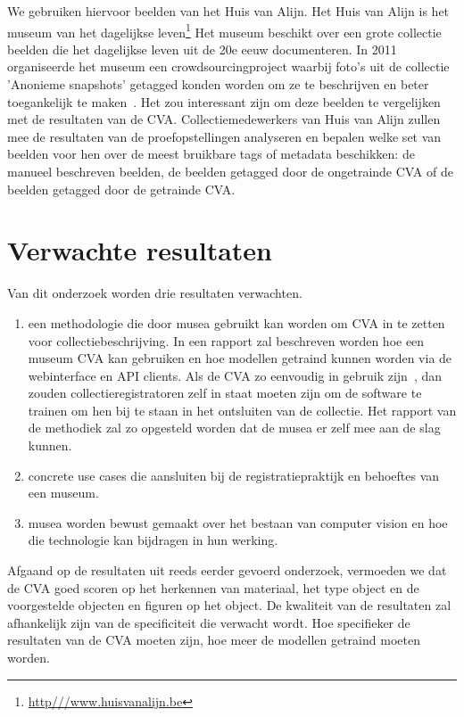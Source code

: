 We gebruiken hiervoor beelden van het Huis van Alijn. Het Huis van Alijn is het museum van het dagelijkse leven\footnote{\url{http///www.huisvanalijn.be}} Het museum beschikt over een grote collectie beelden die het dagelijkse leven uit de 20e eeuw documenteren. In 2011 organiseerde het museum een crowdsourcingproject waarbij foto's uit de collectie 'Anonieme snapshots' getagged konden worden om ze te beschrijven en beter toegankelijk te maken~\autocite{Wiericx2011}. Het zou interessant zijn om deze beelden te vergelijken met de resultaten van de CVA. Collectiemedewerkers van Huis van Alijn zullen mee de resultaten van de proefopstellingen analyseren en bepalen welke set van beelden voor hen over de meest bruikbare tags of metadata beschikken: de manueel beschreven beelden, de beelden getagged door de ongetrainde CVA of de beelden getagged door de getrainde CVA.
\section{Verwachte resultaten}
\label{sec:verwachte_resultaten}

Van dit onderzoek worden drie resultaten verwachten.

\begin{enumerate}
\item een methodologie die door musea gebruikt kan worden om CVA in te zetten voor collectiebeschrijving. In een rapport zal beschreven worden hoe een museum CVA kan gebruiken en hoe modellen getraind kunnen worden via de webinterface en API clients. Als de CVA zo eenvoudig in gebruik zijn~\autocite{Lardinois2018}, dan zouden collectieregistratoren zelf in staat moeten zijn om de software te trainen om hen bij te staan in het ontsluiten van de collectie. Het rapport van de methodiek zal zo opgesteld worden dat de musea er zelf mee aan de slag kunnen.
\item concrete use cases die aansluiten bij de registratiepraktijk en behoeftes van een museum.
\item musea worden bewust gemaakt over het bestaan van computer vision en hoe die technologie kan bijdragen in hun werking.
\end{enumerate}

Afgaand op de resultaten uit reeds eerder gevoerd onderzoek, vermoeden we dat de CVA goed scoren op het herkennen van materiaal, het type object en de voorgestelde objecten en figuren op het object. De kwaliteit van de resultaten zal afhankelijk zijn van de specificiteit die verwacht wordt. Hoe specifieker de resultaten van de CVA moeten zijn, hoe meer de modellen getraind moeten worden.
